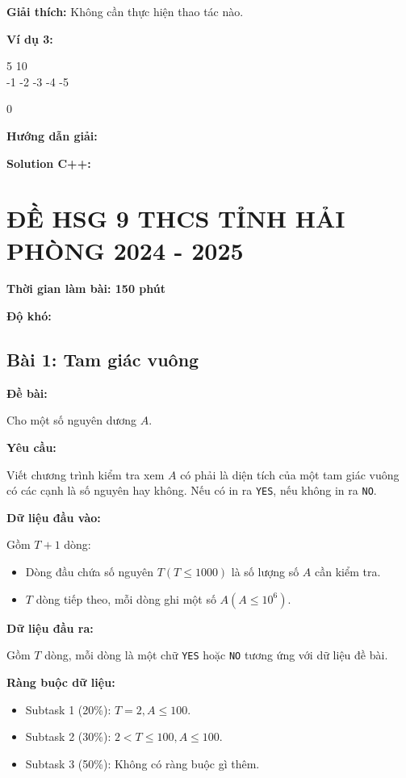 \documentclass[12pt]{scrartcl}  %
\begin{document}
\textbf{Giải thích:}
Không cần thực hiện thao tác nào.

\textbf{Ví dụ 3:}
\begin{tcolorbox}[colback=gray!5!white, colframe=blue!50!black, title=Input]
5 10\\
-1 -2 -3 -4 -5
\end{tcolorbox}
\begin{tcolorbox}[colback=gray!5!white, colframe=green!50!black, title=Output]
0
\end{tcolorbox}

\textbf{Hướng dẫn giải:}

\textbf{Solution C++:}

\section{ĐỀ HSG 9 THCS TỈNH HẢI PHÒNG 2024 - 2025}

\textbf{Thời gian làm bài: 150 phút}

\textbf{Độ khó: }

\subsection{Bài 1: Tam giác vuông}

\textbf{Đề bài:}

Cho một số nguyên dương $A$.

\textbf{Yêu cầu:}

Viết chương trình kiểm tra xem $A$ có phải là diện tích của một tam giác vuông có các cạnh là số nguyên hay không. 
Nếu có in ra \texttt{YES}, nếu không in ra \texttt{NO}.

\textbf{Dữ liệu đầu vào:}

Gồm $T + 1$ dòng:
\begin{itemize}
    \item Dòng đầu chứa số nguyên $T (T \leq 1000)$ là số lượng số $A$ cần kiểm tra. 
    \item $T$ dòng tiếp theo, mỗi dòng ghi một số $A (A \leq 10^6)$.
\end{itemize}

\textbf{Dữ liệu đầu ra:}

Gồm $T$ dòng, mỗi dòng là một chữ \texttt{YES} hoặc \texttt{NO} tương ứng với dữ liệu đề bài.

\textbf{Ràng buộc dữ liệu:}
\begin{itemize}
    \item Subtask 1 (20\%): $T = 2, A \leq 100$.
    \item Subtask 2 (30\%): $2 < T \leq 100, A \leq 100$.
    \item Subtask 3 (50\%): Không có ràng buộc gì thêm.
\end{itemize}
\end{document}
